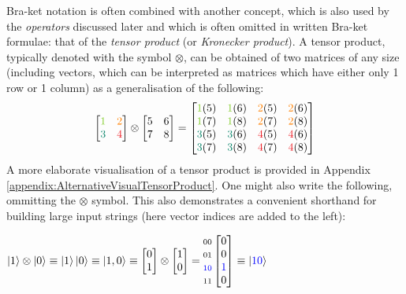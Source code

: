 \documentclass[conference]{IEEEtran}
\begin{document}
Bra-ket notation is often combined with another concept, which is also used by the \textit{operators} discussed later and which is often
omitted in written Bra-ket formulae: that of the \textit{tensor product}
(or \textit{Kronecker product}). A tensor product, typically denoted with the symbol $\otimes$, can be obtained
of two matrices of any size (including vectors, which can be interpreted as matrices which have either only 1 row or 1 column)
as a generalisation of the following:
\begin{equation*}
\begin{bmatrix}
\textcolor{LimeGreen}{1} & \textcolor{orange}{2} \\
\textcolor{PineGreen}{3} & \textcolor{Red}{4}
\end{bmatrix}
\otimes
\begin{bmatrix}
5 & 6 \\
7 & 8
\end{bmatrix}
=
\begin{bmatrix}
\textcolor{LimeGreen}{1}(5) & \textcolor{LimeGreen}{1}(6) & \textcolor{orange}{2}(5) & \textcolor{orange}{2}(6) \\
\textcolor{LimeGreen}{1}(7) & \textcolor{LimeGreen}{1}(8) & \textcolor{orange}{2}(7) & \textcolor{orange}{2}(8) \\
\textcolor{PineGreen}{3}(5) & \textcolor{PineGreen}{3}(6) & \textcolor{Red}{4}(5) & \textcolor{Red}{4}(6) \\
\textcolor{PineGreen}{3}(7) & \textcolor{PineGreen}{3}(8) & \textcolor{Red}{4}(7) & \textcolor{Red}{4}(8)
\end{bmatrix}
\end{equation*}
A more elaborate visualisation of a tensor product is provided in Appendix \ref{appendix:AlternativeVisualTensorProduct}.
One might also write the following, ommitting the $\otimes$ symbol.
This also demonstrates a convenient shorthand for building large input strings
(here vector indices are added to the left):

$
\ket{1}\otimes\ket{0}
\equiv
\ket{1}\ket{0}
\equiv
\ket{1,0}
\equiv
\begin{bmatrix}
0 \\
1
\end{bmatrix}
\otimes
\begin{bmatrix}
1 \\
0
\end{bmatrix}
=
\begin{matrix}
{\scriptstyle 00} \\
{\scriptstyle 01} \\
{\scriptstyle\textcolor{blue}{10}} \\
{\scriptstyle 11} \\
\end{matrix}
\begin{bmatrix}
0 \\
0 \\
\textcolor{blue}{1} \\
0 \\
\end{bmatrix}
\equiv
\ket{\textcolor{blue}{10}}
$
\end{document}
